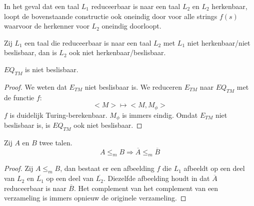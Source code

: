 \documentclass[main.tex]{subfiles}
\begin{document}
\begin{opm}
  In het geval dat een taal $L_{1}$ reduceerbaar is naar een taal $L_{2}$ en $L_{2}$ herkenbaar, loopt de bovenstaande constructie ook oneindig door voor alle strings $f(s)$ waarvoor de herkenner voor $L_{2}$ oneindig doorloopt.
\end{opm}

\begin{gev}
  \label{gev:reductie-niet-beslisbaarheid}
  Zij $L_{1}$ een taal die reduceerbaar is naar een taal $L_{2}$ met $L_{1}$ niet herkenbaar/niet beslisbaar, dan is $L_{2}$ ook niet herkenbaar/beslisbaar.
  \zb
\end{gev}

\begin{st}
  \label{st:eq-tm-niet-besl}
  $EQ_{TM}$ is niet beslisbaar.

  \begin{proof}
    We weten dat $E_{TM}$ niet beslisbaar is.
    We reduceren $E_{TM}$ naar $EQ_{TM}$ met de functie $f$:
    \[
    <M> \mapsto <M,M_{\phi}>
    \]
    $f$ is duidelijk Turing-berekenbaar. $M_{\phi}$ is immers eindig.
    Omdat $E_{TM}$ niet beslisbaar is, is $EQ_{TM}$ ook niet beslisbaar.
  \end{proof}
\end{st}

\begin{st}
  \label{st:reduceerbaarheid-taal-complement}
  Zij $A$ en $B$ twee talen.
  \[ A \le_m B \Rightarrow \overline{A} \le_m \overline{B} \]

  \begin{proof}
    Zij $A \le_{m} B$, dan bestaat er een afbeelding $f$ die $L_{1}$ afbeeldt op een deel van $L_{2}$ en $\overline{L_{1}}$ op een deel van $\overline{L_{2}}$.
    Diezelfde afbeelding houdt in dat $\overline{A}$ reduceerbaar is naar $\overline{B}$.
    Het complement van het complement van een verzameling is immers opnieuw de originele verzameling.
  \end{proof}
\end{st}
\end{document}
